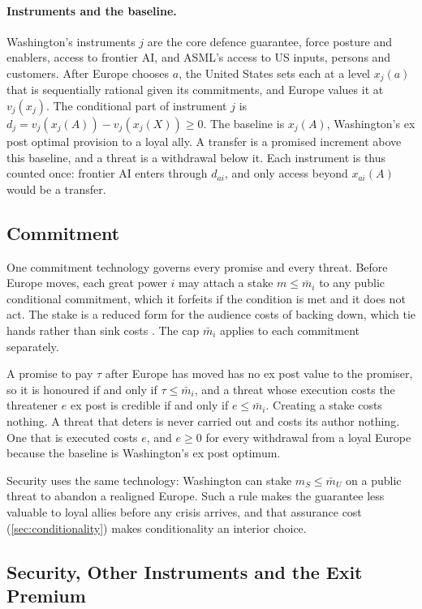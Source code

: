 \paragraph{Instruments and the baseline.} Washington's instruments $j$ are the core defence guarantee, force posture and enablers, access to frontier AI, and ASML's access to US inputs, persons and customers. After Europe chooses $a$, the United States sets each at a level $x_j(a)$ that is sequentially rational given its commitments, and Europe values it at $v_j(x_j)$. The conditional part of instrument $j$ is $d_j=v_j(x_j(A))-v_j(x_j(X))\ge 0$. The baseline is $x_j(A)$, Washington's ex post optimal provision to a loyal ally. A transfer is a promised increment above this baseline, and a threat is a withdrawal below it. Each instrument is thus counted once: frontier AI enters through $d_{ai}$, and only access beyond $x_{ai}(A)$ would be a transfer.

\subsection{Commitment}\label{sec:commitment}

One commitment technology governs every promise and every threat. Before Europe moves, each great power $i$ may attach a stake $m\le\bar m_i$ to any public conditional commitment, which it forfeits if the condition is met and it does not act. The stake is a reduced form for the audience costs of backing down, which tie hands rather than sink costs \citep{fearon1994domestic, fearon1997signaling}. The cap $\bar m_i$ applies to each commitment separately.

A promise to pay $\tau$ after Europe has moved has no ex post value to the promiser, so it is honoured if and only if $\tau\le\bar m_i$, and a threat whose execution costs the threatener $e$ ex post is credible if and only if $e\le\bar m_i$. Creating a stake costs nothing. A threat that deters is never carried out and costs its author nothing. One that is executed costs $e$, and $e\ge 0$ for every withdrawal from a loyal Europe because the baseline is Washington's ex post optimum.

Security uses the same technology: Washington can stake $m_S\le\bar m_U$ on a public threat to abandon a realigned Europe. Such a rule makes the guarantee less valuable to loyal allies before any crisis arrives, and that assurance cost (\cref{sec:conditionality}) makes conditionality an interior choice.

\subsection{Security, Other Instruments and the Exit Premium}\label{sec:security}

